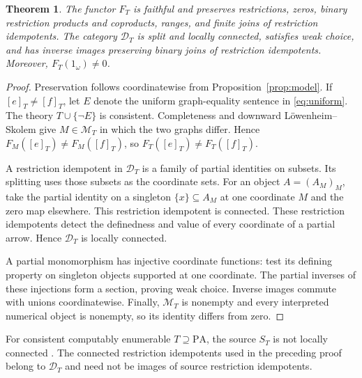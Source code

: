 \documentclass[11pt]{article}
\newtheorem{theorem}{Theorem}[section]
\newcommand{\PA}{\mathrm{PA}}
\begin{document}
\begin{theorem}\label{thm:faithful}
The functor $F_T$ is faithful and preserves restrictions, zeros, binary
restriction products and coproducts, ranges, and finite joins of
restriction idempotents. The category
$\mathcal D_T$ is split and locally connected, satisfies weak choice,
and has inverse images preserving binary joins of restriction
idempotents. Moreover,
$F_T(1_\omega)\ne0$.
\end{theorem}
\begin{proof}
Preservation follows coordinatewise from Proposition~\ref{prop:model}.
If $[e]_T\ne[f]_T$, let $E$ denote the uniform graph-equality sentence
in \eqref{eq:uniform}. The theory $T\cup\{\neg E\}$ is consistent.
Completeness and downward L\"owenheim--Skolem give
$M\in\mathcal M_T$ in which the two graphs differ. Hence
$F_M([e]_T)\ne F_M([f]_T)$, so $F_T([e]_T)\ne F_T([f]_T)$.

A restriction idempotent in $\mathcal D_T$ is a family of partial
identities on subsets. Its splitting uses those subsets as the
coordinate sets. For an object $A=(A_M)_M$, take the partial identity
on a singleton $\{x\}\subseteq A_M$ at one coordinate $M$ and the zero
map elsewhere. This restriction idempotent is connected. These
restriction idempotents detect the definedness and value of every coordinate of a partial arrow. Hence
$\mathcal D_T$ is locally connected.

A partial monomorphism has injective coordinate functions: test its
defining property on singleton objects supported at one coordinate.
The partial inverses of these injections form a section, proving weak
choice. Inverse images commute with unions coordinatewise. Finally,
$\mathcal M_T$ is nonempty and every interpreted numerical object is
nonempty, so its identity differs from zero.
\end{proof}

For consistent computably enumerable $T\supseteq\PA$, the source $S_T$
is not locally connected \cite[Corollary 4.4, pp.~657--658]{DPM}.
The connected restriction idempotents used in the preceding proof
belong to $\mathcal D_T$ and need not be images of source restriction
idempotents.
\end{document}
